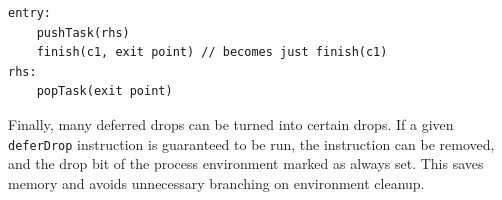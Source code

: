 \begin{lstlisting}[language=IR, frame=bottom]
entry:
    pushTask(rhs)
    finish(c1, exit point) // becomes just finish(c1)
rhs:
    popTask(exit point)
\end{lstlisting}

Finally, many deferred drops can be turned into certain drops. If a given \texttt{deferDrop} instruction is guaranteed to be run, the instruction can be removed, and the drop bit of the process environment marked as always set. This saves memory and avoids unnecessary branching on environment cleanup.
